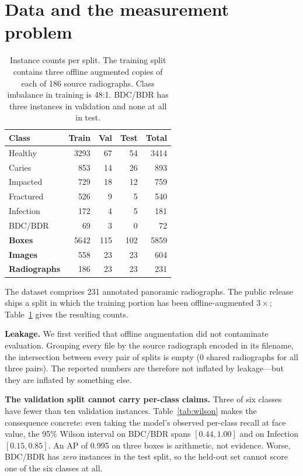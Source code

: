 \documentclass[10pt,twocolumn]{article}
\newcommand{\clsname}[1]{\textsf{#1}}
\begin{document}
\section{Data and the measurement problem}
\label{sec:data}

\begin{table}[t]
\centering\small
\begin{tabular}{lrrrr}
\toprule
\textbf{Class} & \textbf{Train} & \textbf{Val} & \textbf{Test} & \textbf{Total} \\
\midrule
\clsname{Healthy}   & 3293 & 67 & 54 & 3414 \\
\clsname{Caries}    &  853 & 14 & 26 &  893 \\
\clsname{Impacted}  &  729 & 18 & 12 &  759 \\
\clsname{Fractured} &  526 &  9 &  5 &  540 \\
\clsname{Infection} &  172 &  4 &  5 &  181 \\
\clsname{BDC/BDR}   &   69 &  3 &  0 &   72 \\
\midrule
\textbf{Boxes}      & 5642 & 115 & 102 & 5859 \\
\textbf{Images}     &  558 &  23 &  23 &  604 \\
\textbf{Radiographs}&  186 &  23 &  23 &  231 \\
\bottomrule
\end{tabular}
\caption{Instance counts per split. The training split contains three offline
augmented copies of each of 186 source radiographs. Class imbalance in training
is 48:1. \clsname{BDC/BDR} has three instances in validation and none at all in
test.}
\label{tab:data}
\end{table}

The dataset comprises 231 annotated panoramic radiographs. The public release
ships a split in which the training portion has been offline-augmented
$3\times$; Table~\ref{tab:data} gives the resulting counts.

\textbf{Leakage.} We first verified that offline augmentation did not
contaminate evaluation. Grouping every file by the source radiograph encoded in
its filename, the intersection between every pair of splits is empty
(0 shared radiographs for all three pairs). The reported numbers are therefore
not inflated by leakage---but they are inflated by something else.

\textbf{The validation split cannot carry per-class claims.} Three of six
classes have fewer than ten validation instances. Table~\ref{tab:wilson} makes
the consequence concrete: even taking the model's observed per-class recall at
face value, the 95\% Wilson interval on \clsname{BDC/BDR} spans $[0.44, 1.00]$
and on \clsname{Infection} $[0.15, 0.85]$. An AP of 0.995 on three boxes is
arithmetic, not evidence. Worse, \clsname{BDC/BDR} has \emph{zero} instances in
the test split, so the held-out set cannot score one of the six classes at all.
\end{document}
